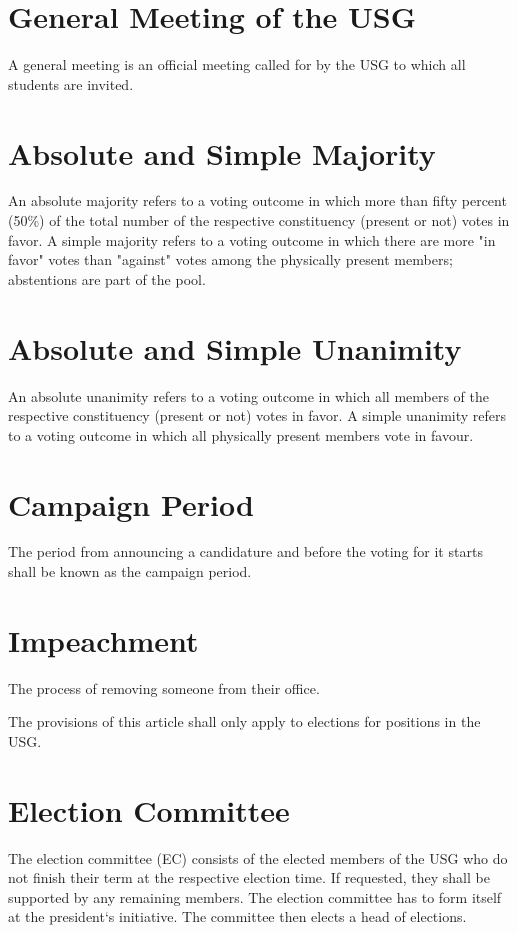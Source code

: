 \documentclass[12pt]{LaTeX_Misc/constitution}
\begin{document}
\section{General Meeting of the USG} 
 A general meeting is an official meeting called for by the USG to which all students are invited.

\section{Absolute and Simple Majority}
An absolute majority refers to a voting outcome in which more than fifty percent (50\%) of the total number of the respective constituency (present or not) votes in favor.  A simple majority refers to a voting outcome in which there are more "in favor" votes than "against" votes among the physically present members; abstentions are part of the pool.

\section{Absolute and Simple Unanimity}
An absolute unanimity refers to a voting outcome in which all members of the respective constituency (present or not) votes in favor. A simple unanimity refers to a voting outcome in which all physically present members vote in favour.


\section{Campaign Period}
The period from announcing a candidature and before the voting for it starts shall be known as the campaign period.

\section{Impeachment}
The process of removing someone from their office.


\label{electionprocedurebylaws}

The provisions of this article shall only apply to elections for positions in the USG.

\section{Election Committee} 
The election committee (EC) consists of the elected members of the USG who do not finish their term at the respective election time. If requested, they shall be supported by any remaining members. The election committee has to form itself at the president`s initiative. The committee then elects a head of elections. 
\end{document}
